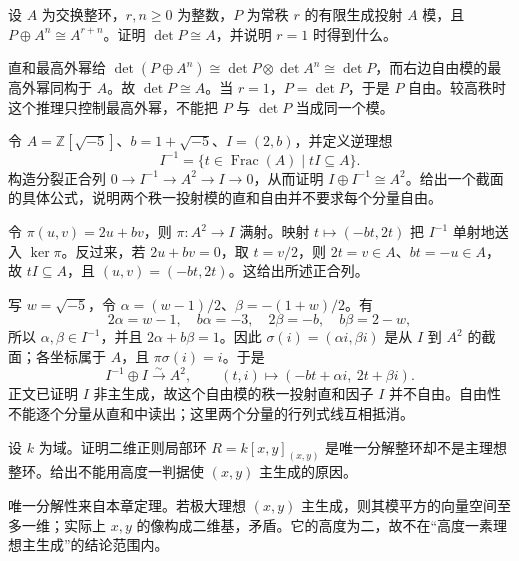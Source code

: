 \begin{exercise}\label{b3:ex:18-stably-free-determinant}
	设 \(A\) 为交换整环，\(r,n\ge0\) 为整数，\(P\) 为常秩 \(r\) 的有限生成投射 \(A\) 模，且 \(P\oplus A^n\cong A^{r+n}\)。证明 \(\det P\cong A\)，并说明 \(r=1\) 时得到什么。
\end{exercise}
\begin{solution}
	直和最高外幂给 \(\det(P\oplus A^n)\cong\det P\otimes\det A^n\cong\det P\)，而右边自由模的最高外幂同构于 \(A\)。故 \(\det P\cong A\)。当 \(r=1\)，\(P=\det P\)，于是 \(P\) 自由。较高秩时这个推理只控制最高外幂，不能把 \(P\) 与 \(\det P\) 当成同一个模。
\end{solution}

\begin{exercise}\label{b3:ex:18-projective-not-ffr}
	令 \(A=\mathbb Z[\sqrt{-5}]\)、\(b=1+\sqrt{-5}\)、\(I=(2,b)\)，并定义逆理想
	\[
		I^{-1}=\{t\in\operatorname{Frac}(A)\mid tI\subseteq A\}.
	\]
	构造分裂正合列 \(0\to I^{-1}\to A^2\to I\to0\)，从而证明 \(I\oplus I^{-1}\cong A^2\)。给出一个截面的具体公式，说明两个秩一投射模的直和自由并不要求每个分量自由。
\end{exercise}
\begin{solution}
	令 \(\pi(u,v)=2u+bv\)，则 \(\pi:A^2\to I\) 满射。映射 \(t\mapsto(-bt,2t)\) 把 \(I^{-1}\) 单射地送入 \(\ker\pi\)。反过来，若 \(2u+bv=0\)，取 \(t=v/2\)，则 \(2t=v\in A\)、\(bt=-u\in A\)，故 \(tI\subseteq A\)，且 \((u,v)=(-bt,2t)\)。这给出所述正合列。

	写 \(w=\sqrt{-5}\)，令 \(\alpha=(w-1)/2\)、\(\beta=-(1+w)/2\)。有
	\[
		2\alpha=w-1,\quad b\alpha=-3,\quad 2\beta=-b,\quad b\beta=2-w,
	\]
	所以 \(\alpha,\beta\in I^{-1}\)，并且 \(2\alpha+b\beta=1\)。因此 \(\sigma(i)=(\alpha i,\beta i)\) 是从 \(I\) 到 \(A^2\) 的截面；各坐标属于 \(A\)，且 \(\pi\sigma(i)=i\)。于是
	\[
		I^{-1}\oplus I\xrightarrow{\sim}A^2,\qquad (t,i)\longmapsto(-bt+\alpha i,\ 2t+\beta i).
	\]
	正文已证明 \(I\) 非主生成，故这个自由模的秩一投射直和因子 \(I\) 并不自由。自由性不能逐个分量从直和中读出；这里两个分量的行列式线互相抵消。
\end{solution}

\begin{exercise}\label{b3:ex:18-higher-height-not-principal}
	设 \(k\) 为域。证明二维正则局部环 \(R=k[x,y]_{(x,y)}\) 是唯一分解整环却不是主理想整环。给出不能用高度一判据使 \((x,y)\) 主生成的原因。
\end{exercise}
\begin{solution}
	唯一分解性来自本章定理。若极大理想 \((x,y)\) 主生成，则其模平方的向量空间至多一维；实际上 \(x,y\) 的像构成二维基，矛盾。它的高度为二，故不在“高度一素理想主生成”的结论范围内。
\end{solution}

